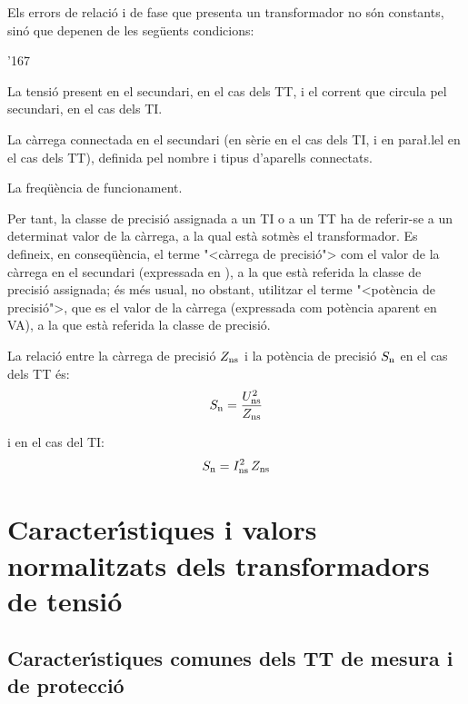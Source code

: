 Els errors de relaci\'{o} i de fase que presenta un transformador no s\'{o}n
constants, sin\'{o} que depenen de les seg\"{u}ents condicions:
\begin{dinglist}{'167}
   \item La tensi\'{o} present en el secundari, en el cas dels TT, i el corrent que
   circula    pel secundari, en el cas dels TI.
   \item La c\`{a}rrega connectada en el secundari (en s\`{e}rie en el cas dels TI,
   i en para{\l.l}el en el cas dels TT), definida pel nombre i tipus d'aparells connectats.
   \item La freq\"{u}\`{e}ncia de funcionament.
\end{dinglist}

Per tant, la classe de precisi\'{o} assignada a un TI o a un TT ha de
referir-se a un determinat valor de la c\`{a}rrega, a la qual est\`{a}
sotm\`{e}s el transformador. Es defineix, en conseq\"{u}\`{e}ncia, el terme
{"<}c\`{a}rrega de precisi\'{o}{">} com el valor de la c\`{a}rrega en el secundari
(expressada en \ohm), a la que est\`{a} referida la classe de precisi\'{o}
assignada; \'{e}s m\'{e}s usual, no obstant,  utilitzar el terme {"<}pot\`{e}ncia
de precisi\'{o}{">}, que es el valor de la c\`{a}rrega (expressada com pot\`{e}ncia
aparent en VA),
 a la que est\`{a} referida la classe de precisi\'{o}.

La relaci\'{o} entre la c\`{a}rrega de precisi\'{o} $Z_\mathrm{ns}$ i la pot\`{e}ncia de
precisi\'{o} $S_\mathrm{n}$ en el cas dels TT \'{e}s:
\begin{equation}
    S_\mathrm{n} = \frac{U_\mathrm{ns}^2}{Z_\mathrm{ns}}
\end{equation}

i en el cas del TI:
\begin{equation}\label{eq:sn_ti}
    S_\mathrm{n} = I_\mathrm{ns}^2 \,Z_\mathrm{ns}
\end{equation}


\section{Caracter\'{\i}stiques i valors normalitzats dels transformadors de tensi\'{o}}

\subsection{Caracter\'{\i}stiques comunes dels TT de mesura i de protecci\'{o}}

